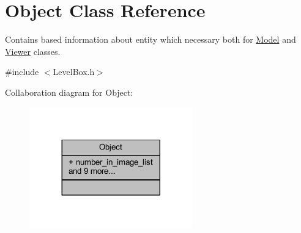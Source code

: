 \hypertarget{class_object}{}\section{Object Class Reference}
\label{class_object}


Contains based information about entity which necessary both for \hyperlink{class_model}{Model} and \hyperlink{class_viewer}{Viewer} classes.  




{\ttfamily \#include $<$Level\+Box.\+h$>$}



Collaboration diagram for Object\+:
\nopagebreak
\begin{figure}[H]
\begin{center}
\leavevmode
\includegraphics[width=200pt]{class_object__coll__graph}
\end{center}
\end{figure}
